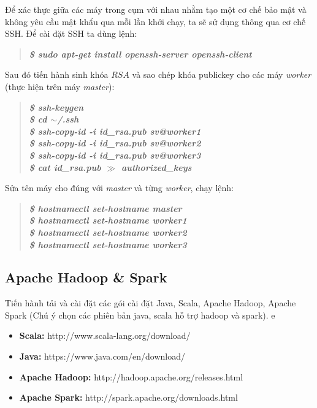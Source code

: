 Để xác thực giữa các máy trong cụm với nhau nhằm tạo một cơ chế bảo mật và không yêu cầu mật khẩu qua mỗi lần khởi chạy, ta sẽ sử dụng thông qua cơ chế SSH. Để cài đặt SSH ta dùng lệnh:
\begin{quote}
	\textbf{\textit{\$ sudo apt-get install openssh-server openssh-client}}
\end{quote}
Sau đó tiến hành sinh khóa $RSA$ và sao chép khóa publickey cho các máy \textit{worker} (thực hiện trên máy \textit{master}):\\
\begin{quote}
	\textbf{\textit{\$ ssh-keygen\\
	\$ cd $\sim$/.ssh\\
	\$ ssh-copy-id -i id\_rsa.pub sv@worker1\\
	\$ ssh-copy-id -i id\_rsa.pub sv@worker2\\
	\$ ssh-copy-id -i id\_rsa.pub sv@worker3\\
	\$ cat id\_rsa.pub $\gg$ authorized\_keys}}
\end{quote}

Sửa tên máy cho đúng với \textit{master} và từng \textit{worker}, chạy lệnh:
\begin{quote}
	\textbf{\textit{\$ hostnamectl set-hostname master\\
			\$ hostnamectl set-hostname worker1 \\
			\$ hostnamectl set-hostname worker2 \\
			\$ hostnamectl set-hostname worker3}}
\end{quote}
\subsection{Apache Hadoop \& Spark}
Tiến hành tải và cài đặt các gói cài đặt Java, Scala, Apache Hadoop, Apache Spark (Chú ý chọn các phiên bản java, scala hỗ trợ hadoop và spark).
e\begin{itemize}
	\item \textbf{Scala:} http://www.scala-lang.org/download/
	\item \textbf{Java:} https://www.java.com/en/download/
	\item \textbf{Apache Hadoop:} http://hadoop.apache.org/releases.html
	\item \textbf{Apache Spark:} http://spark.apache.org/downloads.html
\end{itemize}

